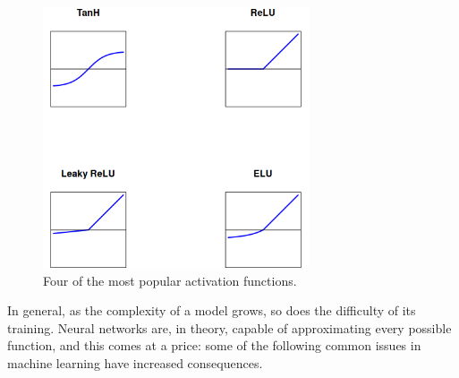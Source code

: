     \vspace{0.2cm}

    \begin{figure}[bth]

        \myfloatalign
        \includegraphics[width=0.7\textwidth]{gfx/ActivationFunctions.png}
        \caption{Four of the most popular activation functions.}

    \end{figure}

    In general, as the complexity of a model grows, so does the difficulty of its training. Neural networks are, in theory, capable of approximating every possible function, and this comes at a price: some of the following common issues in machine learning \cite{nn-atc} have increased consequences.

